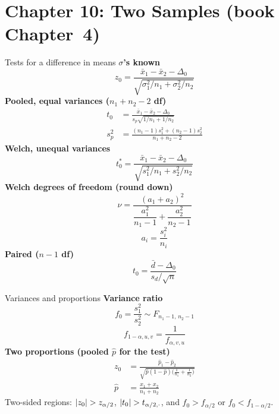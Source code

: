 \section{Chapter 10: Two Samples (book Chapter~4)}

\begin{formulabox}{Tests for a difference in means}
\textbf{$\sigma$'s known}
\[ z_0=\frac{\bar{x}_1-\bar{x}_2-\Delta_0}{\sqrt{\sigma_1^2/n_1+\sigma_2^2/n_2}} \]
\textbf{Pooled, equal variances ($n_1+n_2-2$ df)}
\[ \begin{aligned}t_0&=\frac{\bar{x}_1-\bar{x}_2-\Delta_0}{s_p\sqrt{1/n_1+1/n_2}}\\[4pt] s_p^2&=\frac{(n_1-1)s_1^2+(n_2-1)s_2^2}{n_1+n_2-2}\end{aligned} \]
\textbf{Welch, unequal variances}
\[ t_0^*=\frac{\bar{x}_1-\bar{x}_2-\Delta_0}{\sqrt{s_1^2/n_1+s_2^2/n_2}} \]
\textbf{Welch degrees of freedom (round down)}
\[ \nu=\frac{(a_1+a_2)^2}{\dfrac{a_1^2}{n_1-1}+\dfrac{a_2^2}{n_2-1}} \]
\[ a_i=\frac{s_i^2}{n_i} \]
\textbf{Paired ($n-1$ df)}
\[ t_0=\frac{\bar{d}-\Delta_0}{s_d/\sqrt n} \]
\end{formulabox}

\begin{formulabox}{Variances and proportions}
\textbf{Variance ratio}
\[ f_0=\frac{s_1^2}{s_2^2}\sim F_{n_1-1,\,n_2-1} \]
\[ f_{1-\alpha,u,v}=\frac1{f_{\alpha,v,u}} \]
\textbf{Two proportions (pooled $\hat{p}$ for the test)}
\[ \begin{aligned}z_0&=\frac{\hat{p}_1-\hat{p}_2}{\sqrt{\hat{p}(1-\hat{p})\big(\frac1{n_1}+\frac1{n_2}\big)}}\\[4pt] \hat{p}&=\frac{x_1+x_2}{n_1+n_2}\end{aligned} \]
Two-sided regions: $\lvert z_0\rvert>z_{\alpha/2}$, $\lvert t_0\rvert>t_{\alpha/2,\cdot}$, and $f_0>f_{\alpha/2}$ or $f_0<f_{1-\alpha/2}$.
\end{formulabox}

